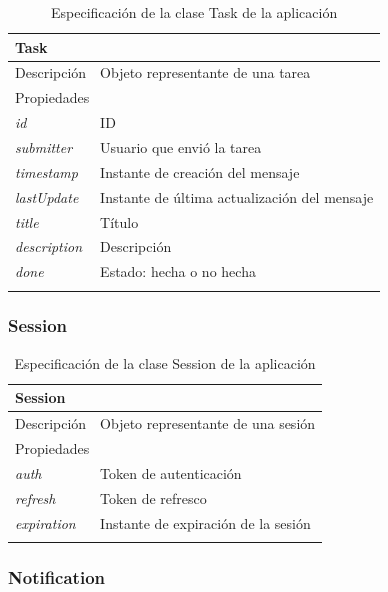 \begin{longtable}{|p{} p{}|}
    \hline
    \multicolumn{2}{|l|}{Task} \\ \hline \hline
    Descripción      & Objeto representante de una tarea \\ \hline
    \multicolumn{2}{|l|}{Propiedades} \\
    \emph{id}  & ID \\
    \emph{submitter}  & Usuario que envió la tarea \\
    \emph{timestamp}  & Instante de creación del mensaje \\
    \emph{lastUpdate}  & Instante de última actualización del mensaje \\
    \emph{title}  & Título \\
    \emph{description}  & Descripción \\
    \emph{done}  & Estado: hecha o no hecha \\  \hline
    \caption{Especificación de la clase Task de la aplicación}
    \label{class:app:task}
\end{longtable}

\subsubsection{Session}

\begin{longtable}{|p{} p{}|}
    \hline
    \multicolumn{2}{|l|}{Session} \\ \hline \hline
    Descripción      & Objeto representante de una sesión \\ \hline
    \multicolumn{2}{|l|}{Propiedades} \\
    \emph{auth}  & Token de autenticación \\
    \emph{refresh}  & Token de refresco \\
    \emph{expiration}  & Instante de expiración de la sesión \\  \hline
    \caption{Especificación de la clase Session de la aplicación}
    \label{class:app:session}
\end{longtable}

\subsubsection{Notification}

